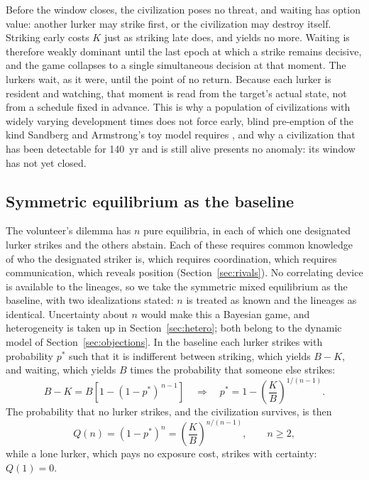 \documentclass[preprint,12pt]{elsarticle}
\theoremstyle{definition}
\begin{document}
Before the window closes, the civilization poses no threat, and waiting has option value: another lurker may strike first, or the civilization may destroy itself. Striking early costs $K$ just as striking late does, and yields no more. Waiting is therefore weakly dominant until the last epoch at which a strike remains decisive, and the game collapses to a single simultaneous decision at that moment. The lurkers wait, as it were, until the point of no return. Because each lurker is resident and watching, that moment is read from the target's actual state, not from a schedule fixed in advance. This is why a population of civilizations with widely varying development times does not force early, blind pre-emption of the kind Sandberg and Armstrong's toy model requires \citep{SandbergArmstrong2013}, and why a civilization that has been detectable for 140~yr and is still alive presents no anomaly: its window has not yet closed.

\subsection{Symmetric equilibrium as the baseline}

The volunteer's dilemma has $n$ pure equilibria, in each of which one designated lurker strikes and the others abstain. Each of these requires common knowledge of who the designated striker is, which requires coordination, which requires communication, which reveals position (Section~\ref{sec:rivals}). No correlating device is available to the lineages, so we take the symmetric mixed equilibrium as the baseline, with two idealizations stated: $n$ is treated as known and the lineages as identical. Uncertainty about $n$ would make this a Bayesian game, and heterogeneity is taken up in Section~\ref{sec:hetero}; both belong to the dynamic model of Section~\ref{sec:objections}. In the baseline each lurker strikes with probability $p^{*}$ such that it is indifferent between striking, which yields $B - K$, and waiting, which yields $B$ times the probability that someone else strikes:
\begin{equation}
B - K = B\left[1 - (1 - p^{*})^{\,n-1}\right]
\quad\Longrightarrow\quad
p^{*} = 1 - \left(\frac{K}{B}\right)^{1/(n-1)} .
\end{equation}
The probability that no lurker strikes, and the civilization survives, is then
\begin{equation}
Q(n) = (1 - p^{*})^{n} = \left(\frac{K}{B}\right)^{n/(n-1)}, \qquad n \geq 2,
\label{eq:Q}
\end{equation}
while a lone lurker, which pays no exposure cost, strikes with certainty: $Q(1) = 0$.
\end{document}
